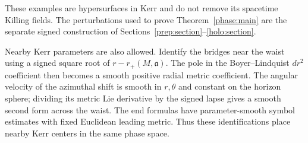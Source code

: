 These examples are hypersurfaces in Kerr and do not remove its
spacetime Killing fields. The perturbations used to prove
Theorem~\ref{phase:main} are the separate signed construction of
Sections~\ref{prep:section}--\ref{holo:section}.

Nearby Kerr parameters are also allowed. Identify the bridges near
the waist using a signed square root of \(r-r_+(M,\mathfrak a)\).
The pole in the Boyer--Lindquist \(dr^2\) coefficient then becomes
a smooth positive radial metric coefficient. The angular velocity
of the azimuthal shift is smooth in \(r,\theta\) and constant on the
horizon sphere; dividing its metric Lie derivative by the signed
lapse gives a smooth second form across the waist. The end formulas
have parameter-smooth symbol estimates with fixed Euclidean leading
metric. Thus these identifications place nearby Kerr centers in
the same phase space.
